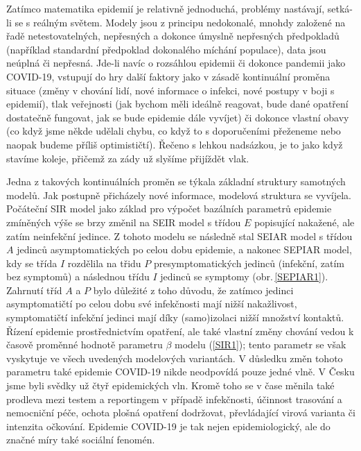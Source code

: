 Zatímco matematika epidemií je relativně jednoduchá, problémy nastávají, setká-li se s reálným světem. Modely jsou z principu nedokonalé, mnohdy založené na řadě netestovatelných, nepřesných a dokonce úmyslně nepřesných předpokladů (například standardní předpoklad dokonalého míchání populace), data jsou neúplná či nepřesná. Jde-li navíc o rozsáhlou epidemii či dokonce pandemii jako COVID-19, vstupují do hry další faktory jako v zásadě kontinuální proměna situace (změny v chování lidí, nové informace o infekci, nové postupy v boji s epidemií), tlak veřejnosti (jak bychom měli ideálně reagovat, bude dané opatření dostatečně fungovat, jak se bude epidemie dále vyvíjet) či dokonce vlastní obavy (co když jsme někde udělali chybu, co když to s doporučeními přeženeme nebo naopak budeme příliš optimističtí). Řečeno s lehkou nadsázkou, je to jako když stavíme koleje, přičemž za zády už slyšíme přijíždět vlak. 

Jedna z takových kontinuálních proměn se týkala základní struktury samotných modelů. Jak postupně přicházely nové informace, modelová struktura se vyvíjela. Počáteční SIR model jako základ pro výpočet bazálních parametrů epidemie zmíněných výše se brzy změnil na SEIR model s třídou $E$ popisující nakažené, ale zatím neinfekční jedince. Z tohoto modelu se následně stal SEIAR model s třídou $A$ jedinců asymptomatických po celou dobu epidemie, a nakonec SEPIAR model, kdy se třída $I$ rozdělila na třidu $P$ presymptomatických jedinců (infekční, zatím bez symptomů) a následnou třídu $I$ jedinců se symptomy (obr.\,\ref{SEPIAR1}). Zahrnutí tříd $A$ a $P$ bylo důležité z toho důvodu, že zatímco jedinci asymptomatičtí po celou dobu své infekčnosti mají nižší nakažlivost, symptomatičtí infekční jedinci mají díky (samo)izolaci nižší množství kontaktů. Řízení epidemie prostřednictvím opatření, ale také vlastní změny chování vedou k časově proměnné hodnotě parametru $\beta$ modelu (\ref{SIR1}); tento parametr se však vyskytuje ve všech uvedených modelových variantách. V důsledku změn tohoto parametru také epidemie COVID-19 nikde neodpovídá pouze jedné vlně. V Česku jsme byli svědky už čtyř epidemických vln. Kromě toho se v čase měnila také prodleva mezi testem a reportingem v případě infekčnosti, účinnost trasování a nemocniční péče, ochota plošná opatření dodržovat, převládající virová varianta či intenzita očkování. Epidemie COVID-19 je tak nejen epidemiologický, ale do značné míry také sociální fenomén.   

